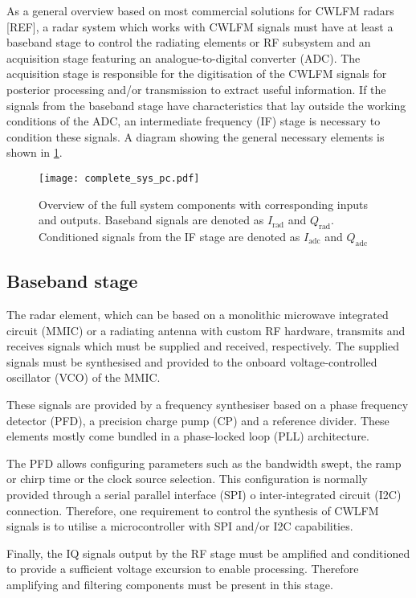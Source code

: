 As a general overview based on most commercial solutions for CWLFM radars [REF], a radar system which works with CWLFM signals must have at least a baseband stage to control the radiating elements or RF subsystem and an acquisition stage featuring an analogue-to-digital converter (ADC). The acquisition stage is responsible for the digitisation of the CWLFM signals for posterior processing and/or transmission to extract useful information. If the signals from the baseband stage have characteristics that lay outside the working conditions of the ADC, an intermediate frequency (IF) stage is necessary to condition these signals. A diagram showing the general necessary elements is shown in \cref{fig:system}.

\begin{figure}[ht]
	\centering
	\texttt{[image: complete\_sys\_pc.pdf]}
	\caption{Overview of the full system components with corresponding inputs and outputs. Baseband signals are denoted as $I_{\mathrm{rad}}$ and $Q_{\mathrm{rad}}$. Conditioned signals from the IF stage are denoted as $I_{\mathrm{adc}}$ and $Q_{\mathrm{adc}}$ \label{fig:system}}
\end{figure}

\subsection{Baseband stage} \label{sec:baseband_general}

The radar element, which can be based on a monolithic microwave integrated circuit (MMIC) or a radiating antenna with custom RF hardware, transmits and receives signals which must be supplied and received, respectively. The supplied signals must be synthesised and provided to the onboard voltage-controlled oscillator (VCO) of the MMIC.

These signals are provided by a frequency synthesiser based on a phase frequency detector (PFD), a precision charge pump (CP) and a reference divider. These elements mostly come bundled in a phase-locked loop (PLL) architecture.

The PFD allows configuring parameters such as the bandwidth swept, the ramp or chirp time or the clock source selection. This configuration is normally provided through a serial parallel interface (SPI) o inter-integrated circuit (I2C) connection. Therefore, one requirement to control the synthesis of CWLFM signals is to utilise a microcontroller with SPI and/or I2C capabilities.

Finally, the IQ signals output by the RF stage must be amplified and conditioned to provide a sufficient voltage excursion to enable processing. Therefore amplifying and filtering components must be present in this stage.


